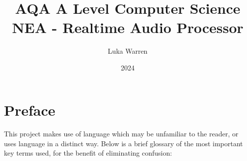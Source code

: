 \documentclass{article}
\title{AQA A Level Computer Science NEA - Realtime Audio Processor}
\date{2024}
\author{Luka Warren}
\begin{document}
	\maketitle
	\tableofcontents
	\newpage

	
	\setcounter{section}{-1}
	\section {Preface}
	\paragraph{}
	This project makes use of language which may be unfamiliar to the reader, or uses language in a distinct way. Below is a brief glossary of the most important key terms used, for the benefit of eliminating confusion:
	
\end{document}

